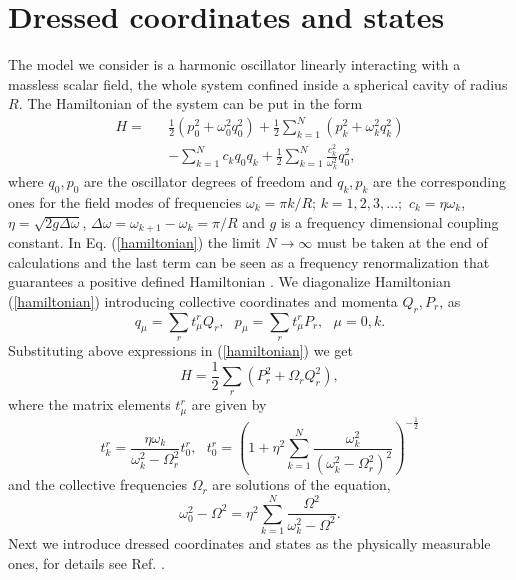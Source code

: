 \documentclass[10pt,english,twocolumn]{revtex4}
\begin{document}
\section{Dressed coordinates and states}
The model we consider is a harmonic oscillator linearly interacting with a massless scalar field, the whole system confined inside
a spherical cavity of radius $R$. The Hamiltonian of the system can be put in the form \cite{adolfo1}
%
\begin{eqnarray}
H=&&\frac{1}{2}\left( p_0^2+\omega_0^2q_0^2\right)+ 
\frac{1}{2}\sum_{k=1}^N\left( p_k^2+\omega_k^2q_k^2\right)\nonumber\\
&& -\sum_{k=1}^Nc_kq_0q_k
+\frac{1}{2}\sum_{k=1}^N\frac{c_k^2}{\omega_k^2}q_0^2,
\label{hamiltonian}
\end{eqnarray}
%
where $q_0, p_0$ are the oscillator degrees of freedom and $q_k, p_k$ are the corresponding ones for the field modes of
frequencies $\omega_k=\pi k/R$; $k=1,2,3,...;$ $c_k=\eta\omega_k$, $\eta=\sqrt{2g\Delta\omega}$,
$\Delta\omega=\omega_{k+1}-\omega_k=\pi/R$ and $g$ is a frequency dimensional coupling constant. In Eq. (\ref{hamiltonian})
the limit $N\to\infty$ must be taken at the end of calculations and the last term can be seen as a frequency renormalization that
guarantees a positive defined Hamiltonian \cite{weiss}. We diagonalize Hamiltonian (\ref{hamiltonian}) introducing collective coordinates and
momenta $Q_r, P_r$, as
%
\begin{equation}
q_\mu=\sum_r t_\mu^rQ_r,~~~p_\mu=\sum_r t_\mu^rP_r,~~~\mu=0,k.
\label{bartocolective}
\end{equation}
%
Substituting above expressions in (\ref{hamiltonian}) we get
%
\begin{equation}
H=\frac{1}{2}\sum_r\left( P_r^2+\Omega_r Q_r^2 \right),
\label{collectiveh}
\end{equation}
%
where the matrix elements $t_\mu^r$ are given by
%
\begin{equation}
t_k^r=\frac{\eta\omega_k}{\omega_k^2-\Omega_r^2}t_0^r,~~~
t_0^r=\left(1+\eta^2\sum_{k=1}^N\frac{\omega_k^2}{(\omega_k^2-\Omega_r^2)^2}\right)^{-\frac{1}{2}}
\label{matrixt}
\end{equation}
%
and the collective frequencies $\Omega_r$ are solutions of the equation,
%
\begin{equation}
\omega_0^2-\Omega^2=\eta^2\sum_{k=1}^N\frac{\Omega^2}{\omega_k^2-\Omega^2}.
\label{collectivef}
\end{equation}
%
Next we introduce dressed coordinates and states as the physically measurable ones, for details see Ref. \cite{yony}.
\end{document}
